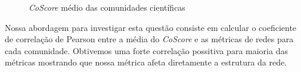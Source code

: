 \documentclass[12pt]{article}
\begin{document}
\begin{figure}[!htb]
  \begin{center}
  \end{center}
  \caption{\textit{CoScore} médio das comunidades científicas}
  \label{fig:average_core_score}
\end{figure}

Nossa abordagem para investigar esta questão consiste em calcular o coeficiente de correlação de Pearson entre a média do
\textit{CoScore} e as métricas de redes para cada comunidade. Obtivemos uma forte correlação possitiva para maioria das métricas
mostrando que nossa métrica afeta diretamente a estrutura da rede.
\end{document}

